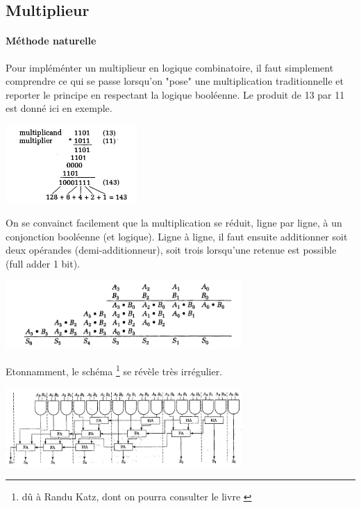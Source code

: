 \subsection{Multiplieur}
\paragraph{Méthode naturelle}

Pour impléménter un multiplieur en logique combinatoire, il faut simplement comprendre ce qui se passe lorsqu'on "pose" une multiplication traditionnelle et reporter
le principe en respectant la logique booléenne. Le produit de 13 par 11 est donné ici en exemple.

\begin{center}
  \centering
  \includegraphics[width=5cm]{./figures/mult-1.png}
\end{center}

On se convainct facilement que la multiplication se réduit, ligne par ligne,
à un conjonction booléenne (et logique). Ligne à ligne, il faut ensuite additionner soit deux opérandes (demi-additionneur), soit trois lorsqu'une retenue est possible (full adder 1 bit).


\begin{center}
  \centering
  \includegraphics[width=9cm]{./figures/mult-2.png}
\end{center}

Etonnamment, le schéma \footnote{dû à Randu Katz, dont on pourra consulter le livre \cite{katz}} se révèle très irrégulier.

\begin{center}
  \centering
  \includegraphics[width=9cm]{./figures/mult-3.png}
\end{center}

